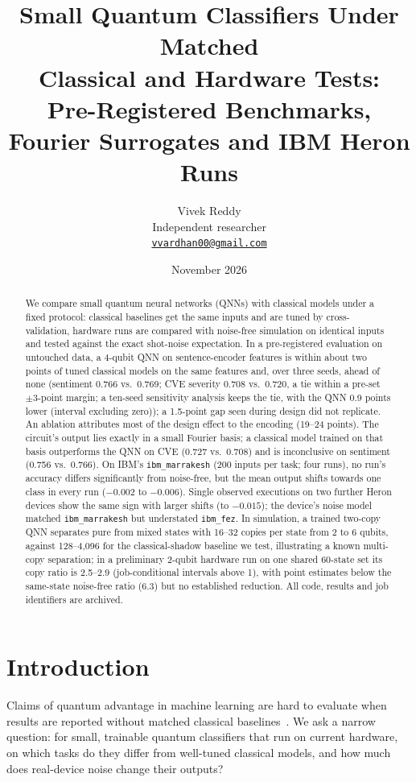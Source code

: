 \documentclass[11pt]{article}
\title{Small Quantum Classifiers Under Matched\\Classical and Hardware Tests:\\[0.3em]
\large Pre-Registered Benchmarks, Fourier Surrogates and IBM Heron Runs}
\author{Vivek Reddy\\\small Independent researcher\\\small \href{mailto:vvardhan00@gmail.com}{\texttt{vvardhan00@gmail.com}}}
\date{November 2026}
\begin{document}
\maketitle

\begin{abstract}
We compare small quantum neural networks (QNNs) with classical models under a fixed protocol: classical baselines get the same inputs and are tuned by cross-validation, hardware runs are compared with noise-free simulation on identical inputs and tested against the exact shot-noise expectation.
In a pre-registered evaluation on untouched data, a 4-qubit QNN on sentence-encoder features is within about two points of tuned classical models on the same features and, over three seeds, ahead of none (sentiment 0.766 vs.\ 0.769; CVE severity 0.708 vs.\ 0.720, a tie within a pre-set $\pm 3$-point margin; a ten-seed sensitivity analysis keeps the tie, with the QNN 0.9 points lower (interval excluding zero)); a 1.5-point gap seen during design did not replicate.
An ablation attributes most of the design effect to the encoding (19--24 points). The circuit's output lies exactly in a small Fourier basis; a classical model trained on that basis outperforms the QNN on CVE (0.727 vs.\ 0.708) and is inconclusive on sentiment (0.756 vs.\ 0.766).
On IBM's \texttt{ibm\_marrakesh} (200 inputs per task; four runs), no run's accuracy differs significantly from noise-free, but the mean output shifts towards one class in every run ($-0.002$ to $-0.006$). Single observed executions on two further Heron devices show the same sign with larger shifts (to $-0.015$); the device's noise model matched \texttt{ibm\_marrakesh} but understated \texttt{ibm\_fez}.
In simulation, a trained two-copy QNN separates pure from mixed states with 16--32 copies per state from 2 to 6 qubits, against 128--4{,}096 for the classical-shadow baseline we test, illustrating a known multi-copy separation; in a preliminary 2-qubit hardware run on one shared 60-state set its copy ratio is 2.5--2.9 (job-conditional intervals above 1), with point estimates below the same-state noise-free ratio (6.3) but no established reduction.
All code, results and job identifiers are archived.
\end{abstract}

\section{Introduction}
Claims of quantum advantage in machine learning are hard to evaluate when results are reported without matched classical baselines~\cite{bowles2024better}.
We ask a narrow question: for small, trainable quantum classifiers that run on current hardware, on which tasks do they differ from well-tuned classical models, and how much does real-device noise change their outputs?
\end{document}

